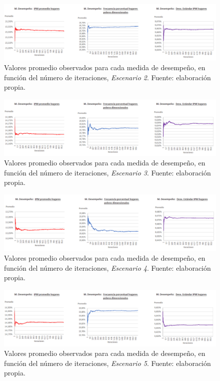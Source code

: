\documentclass[12pt,letterpaper,spanish]{article}
\begin{document}
\begin{figure}[H]
    \centering
    \includegraphics[width=\textwidth]{Max/grafico_MONITOR_OP_Escenario2.png}
    \caption{Valores promedio observados para cada medida de desempeño, en función del número de iteraciones, \textit{Escenario 2}. Fuente: elaboración propia.}
    \label{escenario_2}
\end{figure}

\begin{figure}[H]
    \centering
    \includegraphics[width=\textwidth]{Max/grafico_MONITOR_PES_Escenario3.png}
    \caption{Valores promedio observados para cada medida de desempeño, en función del número de iteraciones, \textit{Escenario 3}. Fuente: elaboración propia.}
    \label{escenario_3}
\end{figure}


\begin{figure}[H]
    \centering
    \includegraphics[width=\textwidth]{Max/grafico_CEPAL_OP_Escenario4.png}
    \caption{Valores promedio observados para cada medida de desempeño, en función del número de iteraciones, \textit{Escenario 4}. Fuente: elaboración propia.}
    \label{escenario_4}
\end{figure}


\begin{figure}[H]
    \centering
    \includegraphics[width=\textwidth]{Max/grafico_simulacion_CEPAL_PES_Escenario5.png}
    \caption{Valores promedio observados para cada medida de desempeño, en función del número de iteraciones, \textit{Escenario 5}. Fuente: elaboración propia.}
    \label{escenario_5}
\end{figure}
\end{document}
